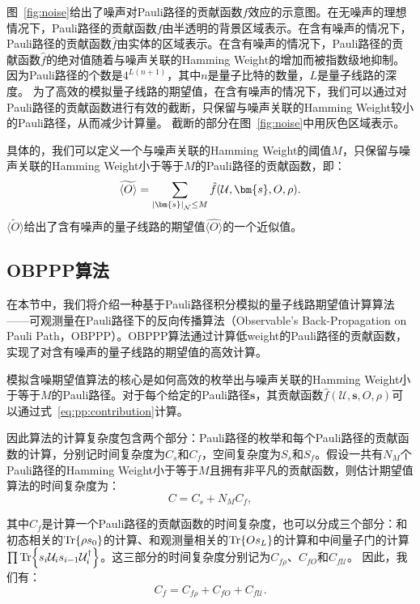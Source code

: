 图~\ref{fig:noise}给出了噪声对Pauli路径的贡献函数$f$效应的示意图。在无噪声的理想情况下，Pauli路径的贡献函数$f$由半透明的背景区域表示。在含有噪声的情况下，Pauli路径的贡献函数$\hat{f}$由实体的区域表示。在含有噪声的情况下，Pauli路径的贡献函数$\hat{f}$的绝对值随着与噪声关联的Hamming Weight的增加而被指数级地抑制。因为Pauli路径的个数是$4^{L(n+1)}$，其中$n$是量子比特的数量，$L$是量子线路的深度。
为了高效的模拟量子线路的期望值，在含有噪声的情况下，我们可以通过对Pauli路径的贡献函数进行有效的截断，只保留与噪声关联的Hamming Weight较小的Pauli路径，从而减少计算量。
截断的部分在图~\ref{fig:noise}中用灰色区域表示。

具体的，我们可以定义一个与噪声关联的Hamming Weight的阈值$M$，只保留与噪声关联的Hamming Weight小于等于$M$的Pauli路径的贡献函数，即：
\begin{equation}\label{eq:truncated_expectation}
    \widetilde{\langle O \rangle} = \sum_{\abs{\bm{s}}_{\mathcal{N}}\leq M} \hat{f}(\mathcal{U},\bm{s},O,\rho).
\end{equation}
$\widetilde{\langle O \rangle}$给出了含有噪声的量子线路的期望值$\widehat{\langle O \rangle}$的一个近似值。

\subsection{OBPPP算法}
在本节中，我们将介绍一种基于Pauli路径积分模拟的量子线路期望值计算算法——可观测量在Pauli路径下的反向传播算法（Observable's Back-Propagation on Pauli Path，OBPPP）。OBPPP算法通过计算低weight的Pauli路径的贡献函数，实现了对含有噪声的量子线路的期望值的高效计算。

模拟含噪期望值算法的核心是如何高效的枚举出与噪声关联的Hamming Weight小于等于$M$的Pauli路径。对于每个给定的Pauli路径$\bm{s}$，其贡献函数$\hat{f}(\mathcal{U},\bm{s},O,\rho)$可以通过式~\eqref{eq:pp:contribution}计算。

因此算法的计算复杂度包含两个部分：Pauli路径的枚举和每个Pauli路径的贡献函数的计算，分别记时间复杂度为$C_s$和$C_f$，空间复杂度为$S_s$和$S_f$。假设一共有$N_M$个Pauli路径的Hamming Weight小于等于$M$且拥有非平凡的贡献函数，则估计期望值算法的时间复杂度为：
\begin{equation}\label{eq:total_cost}
    C = C_s+N_MC_f,
\end{equation}

其中$C_f$是计算一个Pauli路径的贡献函数的时间复杂度，也可以分成三个部分：和初态相关的$\Tr{\rho s_0}$的计算、和观测量相关的$\Tr{Os_L}$的计算和中间量子门的计算$\prod\Tr{s_i\mathcal{U}_i s_{i-1}\mathcal{U}_i^\dagger}$。这三部分的时间复杂度分别记为$C_{f\rho}$、$C_{fO}$和$C_{f\mathcal{U}}$。
因此，我们有：
\begin{equation}\label{eq:cost_f}
    C_f = C_{f\rho}+C_{fO}+C_{f\mathcal{U}}.
\end{equation}


